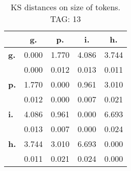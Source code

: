 \begin{table}[h!]
\begin{center}
\begin{tabular}{| l || c | c | c | c |}\hline
 & {\bf g.} & {\bf p.} & {\bf i.} & {\bf h.} \\\hline\hline
{\bf g.} & 0.000 & 1.770 & 4.086 & 3.744 \\
{\bf } & 0.000 & 0.012 & 0.013 & 0.011 \\\hline
{\bf p.} & 1.770 & 0.000 & 0.961 & 3.010 \\
{\bf } & 0.012 & 0.000 & 0.007 & 0.021 \\\hline
{\bf i.} & 4.086 & 0.961 & 0.000 & 6.693 \\
{\bf } & 0.013 & 0.007 & 0.000 & 0.024 \\\hline
{\bf h.} & 3.744 & 3.010 & 6.693 & 0.000 \\
{\bf } & 0.011 & 0.021 & 0.024 & 0.000 \\\hline
\end{tabular}
\caption{KS distances on size of tokens. TAG: 13}
\end{center}
\end{table}